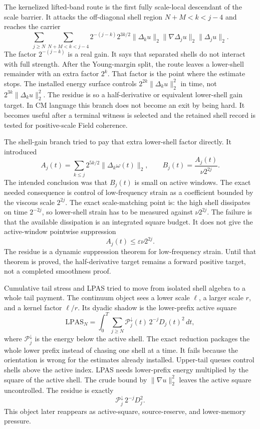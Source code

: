 The kernelized lifted-band route is the first fully scale-local descendant of
the scale barrier.
It attacks the off-diagonal shell region \(N+M<k<j-4\) and reaches the carrier
\[
  \sum_{j\ge N}\sum_{N+M<k<j-4}
  2^{-(j-k)}2^{3k/2}\|\Delta_k u\|_2
  \|\nabla\Delta_j u\|_2\|\Delta_j u\|_2 .
\]
The factor \(2^{-(j-k)}\) is a real gain.
It says that separated shells do not interact with full strength.
After the Young-margin split, the route leaves a lower-shell remainder with an extra
factor \(2^k\).
That factor is the point where the estimate stops.
The installed energy surface controls \(2^{2k}\|\Delta_k u\|_2^2\) in time, not
\(2^{3k}\|\Delta_k u\|_2^2\).
The residue is so a half-derivative or equivalent lower-shell gain
target.
In CM language this branch does not become an exit by being hard.
It becomes useful after a terminal witness is selected and the retained shell
record is tested for positive-scale Field coherence.

The shell-gain branch tried to pay that extra lower-shell factor directly.
It introduced
\[
  A_j(t)=\sum_{k\le j}2^{5k/2}\|\Delta_k\omega(t)\|_2,
  \qquad
  B_j(t)=\frac{A_j(t)}{\nu 2^{2j}} .
\]
The intended conclusion was that \(B_j(t)\) is small on active windows.
The exact needed consequence is control of low-frequency strain as a coefficient
bounded by the viscous scale \(2^{2j}\).
The exact scale-matching point is:
the high shell dissipates on time \(2^{-2j}\), so lower-shell strain has to be
measured against \(\nu 2^{2j}\).
The failure is that the available dissipation is an integrated square budget.
It does not give the active-window pointwise suppression
\[
  A_j(t)\le \varepsilon\nu 2^{2j}.
\]
The residue is a dynamic suppression theorem for low-frequency strain.
Until that theorem is proved, the half-derivative target remains a forward
positive target, not a completed smoothness proof.

Cumulative tail stress and LPAS tried to move from isolated shell algebra to a
whole tail payment.
The continuum object sees a lower scale \(\ell\), a larger scale \(r\), and a
kernel factor \(\ell/r\).
Its dyadic shadow is the lower-prefix active square
\[
  \mathrm{LPAS}_N
  =
  \int_0^T\sum_{j\ge N}
  \mathcal P_j^\downarrow(t)\,2^{-j}D_j(t)^2\,dt,
\]
where \(\mathcal P_j^\downarrow\) is the energy below the active shell.
The exact reduction packages the whole lower prefix instead of chasing one shell
at a time.
It fails because the orientation is wrong for the estimates already installed.
Upper-tail queues control shells above the active index.
LPAS needs lower-prefix energy multiplied by the square of the active shell.
The crude bound by \(\|\nabla u\|_2^2\) leaves the active square uncontrolled.
The residue is exactly
\[
  \mathcal P_j^\downarrow\,2^{-j}D_j^2 .
\]
This object later reappears as active-square, source-reserve, and lower-memory
pressure.

